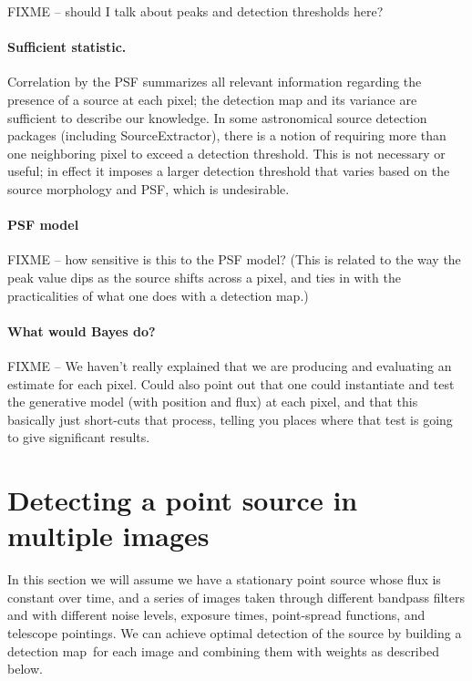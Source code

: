 \documentclass[letterpaper,preprint]{aastex62}
\newcommand{\detmap}{detection map}
\begin{document}
FIXME -- should I talk about peaks and detection thresholds here?

\paragraph{Sufficient statistic.}  Correlation by the PSF summarizes
all relevant information regarding the presence of a source at
each pixel; the detection map and its variance are sufficient to
describe our knowledge.  In some astronomical source detection
packages (including SourceExtractor), there is a notion of requiring
more than one neighboring pixel to exceed a detection threshold.  This
is not necessary or useful; in effect it imposes a larger detection
threshold that varies based on the source morphology and PSF, which is
undesirable.

\paragraph{PSF model} FIXME -- how sensitive is this to the PSF model?
(This is related to the way the peak value dips as the source shifts
across a pixel, and ties in with the practicalities of what one does
with a detection map.)

\paragraph{What would Bayes do?}  FIXME -- We haven't really explained that
we are producing and evaluating an estimate for each pixel.  Could
also point out that one could instantiate and test the generative
model (with position and flux) at each pixel, and that this basically
just short-cuts that process, telling you places where that test is
going to give significant results.


\section{Detecting a point source in multiple images}

In this section we will assume we have a stationary point source whose
flux is constant over time, and a series of images taken through
different bandpass filters and with different noise levels, exposure
times, point-spread functions, and telescope pointings.  We can
achieve optimal detection of the source by building a \detmap\ for
each image and combining them with weights as described below.
\end{document}
